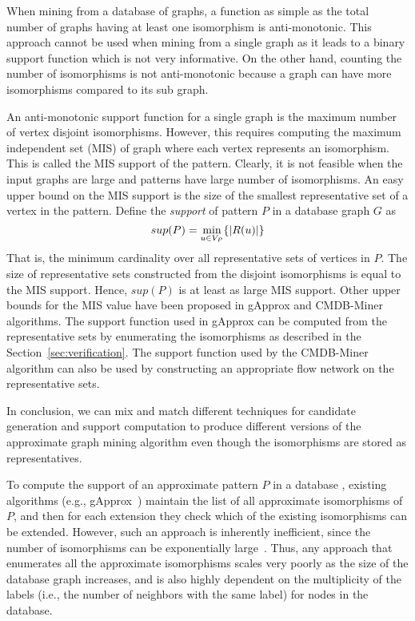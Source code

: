 When mining from a database of graphs, a function as simple as the total number
of graphs having at least one isomorphism is anti-monotonic. This approach cannot
be used when mining from a single graph as it leads to a binary support function
which is not very informative. On the other hand, counting the number of
isomorphisms is not anti-monotonic because a graph can have more isomorphisms
compared to its sub graph.

An anti-monotonic support function for a single graph is the maximum number of
vertex disjoint isomorphisms. However, this requires computing the maximum
independent set (MIS) of graph where each vertex represents an isomorphism.
This is called the MIS support of the pattern.
Clearly, it is not feasible when the input graphs are large and patterns have
large number of isomorphisms. An easy upper bound on the MIS support is the size
of the smallest representative set of a vertex in the pattern.  Define the {\em
support} of pattern $P$ in a database graph $G$ as $$sup(P) = \min_{u \in V_P}
\{ |R(u)| \}$$ That is, the minimum cardinality over all representative sets of
vertices in $P$.  The size of representative sets constructed from the disjoint
isomorphisms is equal to the MIS support. Hence, $sup(P)$ is at least as large
MIS support.  Other upper bounds for the MIS value have been proposed in gApprox
and CMDB-Miner algorithms. The support function used in gApprox can be computed
from the representative sets by enumerating the isomorphisms as described in the
Section~\ref{sec:verification}.  The support function used by the CMDB-Miner
algorithm can also be used by constructing an appropriate flow network on the
representative sets.

In conclusion, we can mix and match different techniques for candidate
generation and support computation to produce different versions of the
approximate graph mining algorithm even though the isomorphisms are stored as
representatives.

To compute the support of an approximate pattern $P$ in a database \db,
existing algorithms (e.g., gApprox~\cite{gapprox}) maintain the list of
all approximate isomorphisms of $P$, and then for each extension they
check which of the existing isomorphisms can be extended. However, such an
approach is inherently inefficient, since the number of isomorphisms can
be exponentially large~\cite{2011-icdm}.  Thus, any approach that
enumerates all the approximate isomorphisms scales very poorly as the size
of the database graph increases, and is also highly dependent on the
multiplicity of the labels (i.e., the number of neighbors with the same
label) for nodes in the database.

